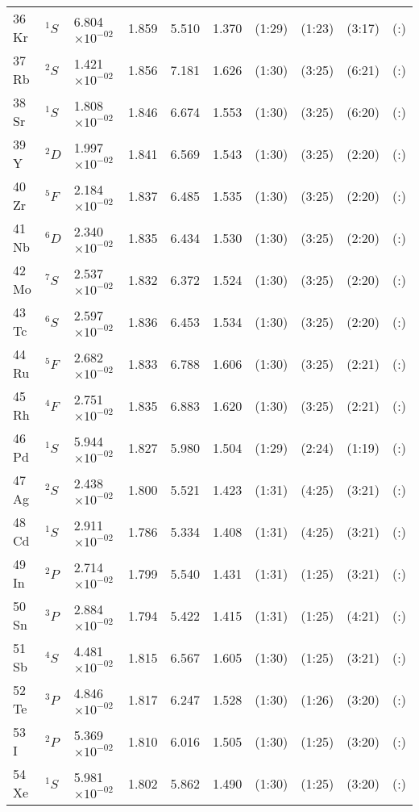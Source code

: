 \documentclass[12pt]{book}
\begin{document}
\begin{center}
\begin{longtable}{l l l l l l l l l l}
36 Kr & $^{1}S$ & 6.804$\times10^{-02}$ & 1.859 & 5.510 & 1.370 & (1:29) & (1:23) & (3:17) & (:) \\
37 Rb & $^{2}S$ & 1.421$\times10^{-02}$ & 1.856 & 7.181 & 1.626 & (1:30) & (3:25) & (6:21) & (:) \\
38 Sr & $^{1}S$ & 1.808$\times10^{-02}$ & 1.846 & 6.674 & 1.553 & (1:30) & (3:25) & (6:20) & (:) \\
39 Y & $^{2}D$ & 1.997$\times10^{-02}$ & 1.841 & 6.569 & 1.543 & (1:30) & (3:25) & (2:20) & (:) \\
40 Zr & $^{5}F$ & 2.184$\times10^{-02}$ & 1.837 & 6.485 & 1.535 & (1:30) & (3:25) & (2:20) & (:) \\
41 Nb & $^{6}D$ & 2.340$\times10^{-02}$ & 1.835 & 6.434 & 1.530 & (1:30) & (3:25) & (2:20) & (:) \\
42 Mo & $^{7}S$ & 2.537$\times10^{-02}$ & 1.832 & 6.372 & 1.524 & (1:30) & (3:25) & (2:20) & (:) \\
43 Tc & $^{6}S$ & 2.597$\times10^{-02}$ & 1.836 & 6.453 & 1.534 & (1:30) & (3:25) & (2:20) & (:) \\
44 Ru & $^{5}F$ & 2.682$\times10^{-02}$ & 1.833 & 6.788 & 1.606 & (1:30) & (3:25) & (2:21) & (:) \\
45 Rh & $^{4}F$ & 2.751$\times10^{-02}$ & 1.835 & 6.883 & 1.620 & (1:30) & (3:25) & (2:21) & (:) \\
46 Pd & $^{1}S$ & 5.944$\times10^{-02}$ & 1.827 & 5.980 & 1.504 & (1:29) & (2:24) & (1:19) & (:) \\
47 Ag & $^{2}S$ & 2.438$\times10^{-02}$ & 1.800 & 5.521 & 1.423 & (1:31) & (4:25) & (3:21) & (:) \\
48 Cd & $^{1}S$ & 2.911$\times10^{-02}$ & 1.786 & 5.334 & 1.408 & (1:31) & (4:25) & (3:21) & (:) \\
49 In & $^{2}P$ & 2.714$\times10^{-02}$ & 1.799 & 5.540 & 1.431 & (1:31) & (1:25) & (3:21) & (:) \\
50 Sn & $^{3}P$ & 2.884$\times10^{-02}$ & 1.794 & 5.422 & 1.415 & (1:31) & (1:25) & (4:21) & (:) \\
51 Sb & $^{4}S$ & 4.481$\times10^{-02}$ & 1.815 & 6.567 & 1.605 & (1:30) & (1:25) & (3:21) & (:) \\
52 Te & $^{3}P$ & 4.846$\times10^{-02}$ & 1.817 & 6.247 & 1.528 & (1:30) & (1:26) & (3:20) & (:) \\
53 I & $^{2}P$ & 5.369$\times10^{-02}$ & 1.810 & 6.016 & 1.505 & (1:30) & (1:25) & (3:20) & (:) \\
54 Xe & $^{1}S$ & 5.981$\times10^{-02}$ & 1.802 & 5.862 & 1.490 & (1:30) & (1:25) & (3:20) & (:) \\

\end{longtable}
\end{center}
\end{document}

